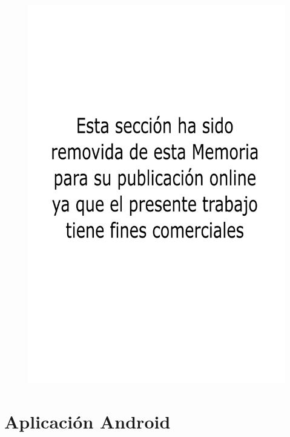 \begin{figure}[!h]
	\centering
	\includegraphics[width=14cm]{./Figures/comercial.png}
\end{figure}


\section{Aplicación Android}
\label{section:app}

